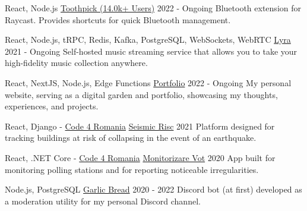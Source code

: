 
\begin{cventries}

  \cventry
  {React, Node.js}
  {\href{https://github.com/VladCuciureanu/Toothpick}{Toothpick (14.0k+ Users)}}
  {}
  {2022 - Ongoing}
  {
    Bluetooth extension for Raycast. Provides shortcuts for quick Bluetooth management.
  }

  \cventry
  {React, Node.js, tRPC, Redis, Kafka, PostgreSQL, WebSockets, WebRTC}
  {\href{https://github.com/VladCuciureanu/Lyra}{Lyra}}
  {}
  {2021 - Ongoing}
  {
    Self-hosted music streaming service that allows you to take your high-fidelity music collection anywhere.
  }

  \cventry
  {React, NextJS, Node.js, Edge Functions}
  {\href{https://vladcuciureanu.com}{Portfolio}}
  {}
  {2022 - Ongoing}
  {
    My personal website, serving as a digital garden and portfolio, showcasing my thoughts, experiences, and projects.
  }

  \cventry
  {React, Django - \href{https://code4.ro}{Code 4 Romania}}
  {\href{https://github.com/code4romania/seismic-risc}{Seismic Risc}}
  {}
  {2021}
  {
    Platform designed for tracking buildings at risk of collapsing in the event of an earthquake.
  }

  \cventry
  {React, .NET Core - \href{https://code4.ro}{Code 4 Romania}}
  {\href{https://github.com/code4romania/monitorizare-vot/wiki}{Monitorizare Vot}}
  {}
  {2020}
  {
    App built for monitoring polling stations and for reporting noticeable irregularities.
  }

  \cventry
  {Node.js, PostgreSQL}
  {\href{https://github.com/VladCuciureanu/GarlicBread}{Garlic Bread}}
  {}
  {2020 - 2022}
  {
    Discord bot (at first) developed as a moderation utility for my personal Discord channel.
  }

\end{cventries}